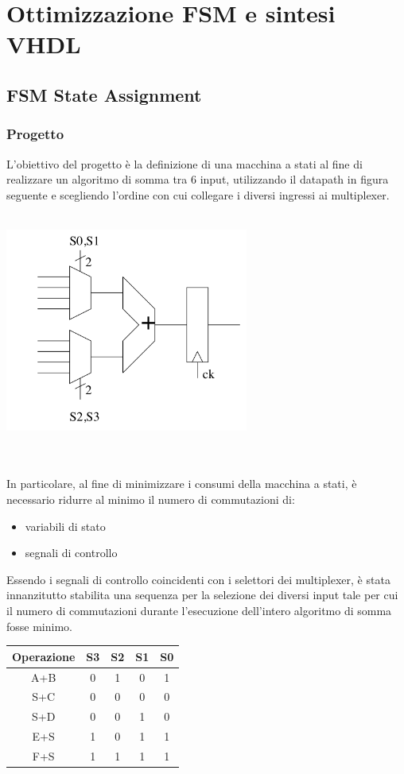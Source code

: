 \documentclass[11pt,  english, makeidx, a4paper, titlepage, oneside]{book}
\begin{document}
\chapter{Ottimizzazione FSM e sintesi VHDL}    
\section{FSM State Assignment}
\subsection{Progetto}
L'obiettivo del progetto è la definizione di una macchina  a stati al fine di realizzare un algoritmo di somma tra 6 input, utilizzando il datapath in figura seguente e scegliendo l'ordine con cui collegare i diversi ingressi ai multiplexer.
\\\\
\centerline{\includegraphics[width=8cm]{./img/Lab_2/Datapath.png}}
\\\\   
In particolare, al fine di minimizzare i consumi della macchina a stati, è necessario ridurre al minimo il numero di commutazioni di:
\begin{itemize}
\item variabili di stato
\item segnali di controllo
\end{itemize} 
Essendo i segnali di controllo coincidenti con i selettori dei multiplexer, è stata innanzitutto stabilita una sequenza per la selezione dei diversi input tale per cui il numero di commutazioni durante l'esecuzione dell'intero algoritmo di somma fosse minimo.
\begin{center}
	\begin{tabular}{|c|c|c|c|c|}
	\hline
	Operazione & S3 & S2 & S1 & S0 \\ 
	\hline
	A+B & 0 & 1 & 0 & 1 \\
	\hline
	S+C & 0 & 0 & 0 & 0  \\
	\hline
	S+D & 0 & 0 & 1 & 0  \\
	\hline
    E+S & 1 & 0 & 1 & 1  \\
	\hline
	F+S & 1 & 1 & 1 & 1 \\
	\hline
	\end{tabular}	
\end{center}
\end{document}
